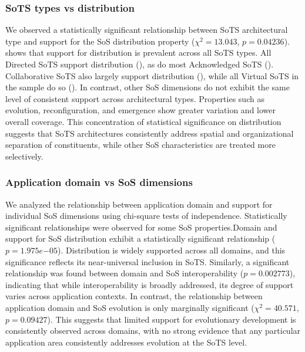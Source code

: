 \subsubsection{SoTS types vs distribution}
\label{sec:orthogonal-sots-distribution}

We observed a statistically significant relationship between SoTS architectural type and support for the SoS distribution property ($\chi^2 = 13.043$, $p = 0.04236$).  shows that support for distribution is prevalent across all SoTS types. All Directed SoTS support distribution (), as do most Acknowledged SoTS (). Collaborative SoTS also largely support distribution (), while all Virtual SoTS in the sample do so (). In contrast, other SoS dimensions do not exhibit the same level of consistent support across architectural types. Properties such as evolution, reconfiguration, and emergence show greater variation and lower overall coverage. This concentration of statistical significance on distribution suggests that SoTS architectures consistently address spatial and organizational separation of constituents, while other SoS characteristics are treated more selectively.




\subsubsection{Application domain vs SoS dimensions}\label{sec:orthogonal-domain-sos}

We analyzed the relationship between application domain and support for individual SoS dimensions using chi-square tests of independence. Statistically significant relationships were observed for some SoS properties.Domain and support for SoS distribution exhibit a statistically significant relationship ($p = 1.975e{-05}$). Distribution is widely supported across all domains, and this significance reflects its near-universal inclusion in SoTS. Similarly, a significant relationship was found between domain and SoS interoperability ($p = 0.002773$), indicating that while interoperability is broadly addressed, its degree of support varies across application contexts. In contrast, the relationship between application domain and SoS evolution is only marginally significant ($\chi^2 = 40.571$, $p = 0.09427$). This suggests that limited support for evolutionary development is consistently observed across domains, with no strong evidence that any particular application area consistently addresses evolution at the SoTS level.
